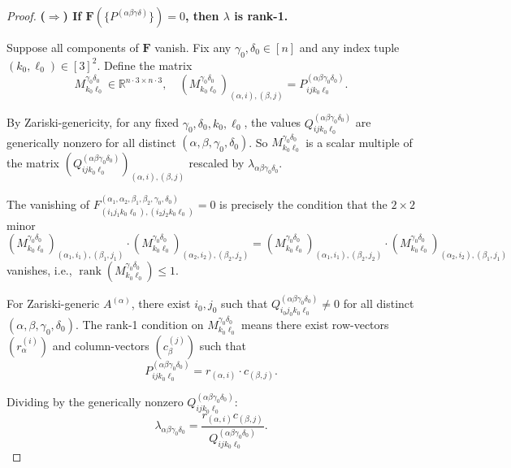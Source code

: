 \documentclass[12pt]{article}
\theoremstyle{definition}
\DeclareMathOperator{\rank}{rank}
\newcommand{\R}{\mathbb{R}}
\begin{document}
\begin{proof}
\medskip
\textbf{($\Rightarrow$) If $\mathbf{F}(\{P^{(\alpha\beta\gamma\delta)}\}) = 0$, then $\lambda$ is rank-1.}

Suppose all components of $\mathbf{F}$ vanish. Fix any $\gamma_0, \delta_0 \in [n]$ and any index tuple $(k_0, \ell_0) \in [3]^2$. Define the matrix
\begin{equation}\label{eq:Mlambda}
M^{\gamma_0\delta_0}_{k_0\ell_0} \in \R^{n \cdot 3 \times n \cdot 3}, \quad (M^{\gamma_0\delta_0}_{k_0\ell_0})_{(\alpha,i),(\beta,j)} = P^{(\alpha\beta\gamma_0\delta_0)}_{ijk_0\ell_0}.
\end{equation}

By Zariski-genericity, for any fixed $\gamma_0,\delta_0,k_0,\ell_0$, the values $Q^{(\alpha\beta\gamma_0\delta_0)}_{ijk_0\ell_0}$ are generically nonzero for all distinct $(\alpha,\beta,\gamma_0,\delta_0)$. So $M^{\gamma_0\delta_0}_{k_0\ell_0}$ is a scalar multiple of the matrix $(Q^{(\alpha\beta\gamma_0\delta_0)}_{ijk_0\ell_0})_{(\alpha,i),(\beta,j)}$ rescaled by $\lambda_{\alpha\beta\gamma_0\delta_0}$.

The vanishing of $F^{(\alpha_1,\alpha_2,\beta_1,\beta_2,\gamma_0,\delta_0)}_{(i_1j_1k_0\ell_0),(i_2j_2k_0\ell_0)} = 0$ is precisely the condition that the $2\times 2$ minor
\[
(M^{\gamma_0\delta_0}_{k_0\ell_0})_{(\alpha_1,i_1),(\beta_1,j_1)} \cdot (M^{\gamma_0\delta_0}_{k_0\ell_0})_{(\alpha_2,i_2),(\beta_2,j_2)}
= (M^{\gamma_0\delta_0}_{k_0\ell_0})_{(\alpha_1,i_1),(\beta_2,j_2)} \cdot (M^{\gamma_0\delta_0}_{k_0\ell_0})_{(\alpha_2,i_2),(\beta_1,j_1)}
\]
vanishes, i.e., $\rank(M^{\gamma_0\delta_0}_{k_0\ell_0}) \leq 1$.

For Zariski-generic $A^{(\alpha)}$, there exist $i_0,j_0$ such that $Q^{(\alpha\beta\gamma_0\delta_0)}_{i_0j_0k_0\ell_0} \neq 0$ for all distinct $(\alpha,\beta,\gamma_0,\delta_0)$. The rank-1 condition on $M^{\gamma_0\delta_0}_{k_0\ell_0}$ means there exist row-vectors $(r_\alpha^{(i)})$ and column-vectors $(c_\beta^{(j)})$ such that
\[
P^{(\alpha\beta\gamma_0\delta_0)}_{ij k_0\ell_0} = r_{(\alpha,i)} \cdot c_{(\beta,j)}.
\]

Dividing by the generically nonzero $Q^{(\alpha\beta\gamma_0\delta_0)}_{ijk_0\ell_0}$:
\[
\lambda_{\alpha\beta\gamma_0\delta_0} = \frac{r_{(\alpha,i)}c_{(\beta,j)}}{Q^{(\alpha\beta\gamma_0\delta_0)}_{ijk_0\ell_0}}.
\]


\end{proof}
\end{document}
